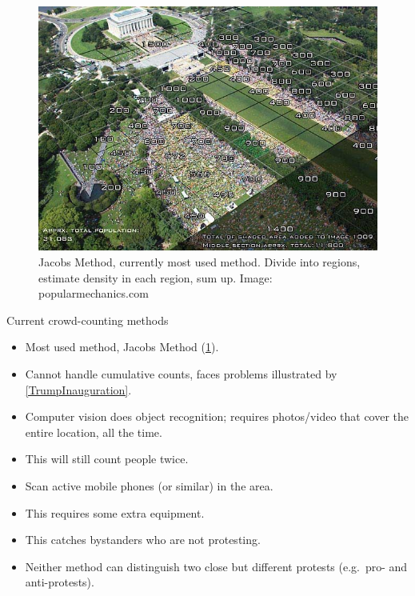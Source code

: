 \begin{columns}[t]

  \begin{column}{0.32\linewidth}

    \begin{figure}
      \centering
      \includegraphics[width=\linewidth]{fig/Jacobs-method.jpg}
      \caption{%
        Jacobs Method, currently most used method.
        Divide into regions, estimate density in each region, sum up.
        Image: popularmechanics.com
      }\label{JacobsMethod}
    \end{figure}

    \begin{purpleblock}{Current crowd-counting methods}
      \begin{itemize}
        \item Most used method, Jacobs Method (\cref{JacobsMethod}).
        \item {\color{red} Cannot handle cumulative counts, faces problems 
            illustrated by \cref{TrumpInauguration}.}
        \item Computer vision does object recognition; requires photos/video 
          that cover the entire location, all the time.
        \item {\color{red} This will still count people twice.}
        \item Scan active mobile phones (or similar) in the area.
        \item This requires some extra equipment.
        \item {\color{red} This catches bystanders who are not protesting.}
        \item {\color{red} Neither method can distinguish two close but 
            different protests (e.g.\ pro- and anti-protests).}
      \end{itemize}
    \end{purpleblock}


\end{column}
\end{columns}
